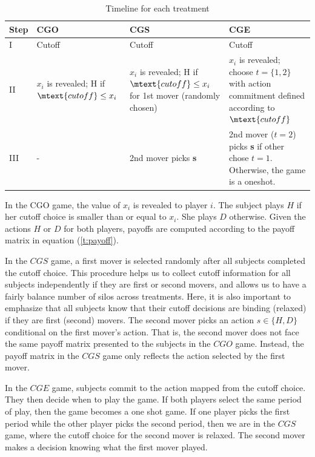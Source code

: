 \documentclass[11pt,english]{article}
\begin{document}
\begin{table}[ht]
\begin{center}
\begin{tabular}{l|m{2.4cm}|m{3.5cm}|m{4cm}}
  Step & CGO & CGS & CGE\\
  \hline 
I & Cutoff & Cutoff & Cutoff \\
\hline
II& $x_i$ is revealed; H if $\mtext{cutoff}\leq x_i$ & $x_i$ is revealed; H if $\mtext{cutoff}\leq x_i$ for 1st mover (randomly chosen)
& $x_i$ is revealed; choose $t=\{1,2\}$ with action commitment defined according to $\mtext{cutoff}$\\
\hline
III & - & 2nd mover picks \textbf{s} & 2nd mover ($t=2$) picks \textbf{s} if other chose $t=1$. Otherwise, the game is a oneshot.

\end{tabular}
\end{center}
\caption{Timeline for each treatment}
\label{table:time}
\end{table}

In the CGO game, the value of $x_i$ is revealed to player $i$. The subject plays $H$ if her cutoff choice is smaller than or equal to $x_i$. She plays $D$ otherwise. Given the actions $H$ or $D$ for both players, payoffs are computed according to the payoff matrix in equation (\ref{t:payoff}). 

In the $CGS$ game, a first mover is selected randomly after all subjects completed the cutoff choice. This procedure helps us to collect cutoff information for all subjects independently if they are first or second movers, and allows us to have a fairly balance number of silos across treatments. Here, it is also important to emphasize that all subjects know that their cutoff decisions are binding (relaxed) if they are first (second) movers. The second mover picks an action $s\in\{H,D\}$ conditional on the first mover's action. That is, the second mover does not face the same payoff matrix presented to the subjects in the $CGO $ game. Instead, the payoff matrix in the $CGS$ game only reflects the action selected by the first mover. 

In the $CGE$ game, subjects commit to the action mapped from the cutoff choice. They then decide when to play the game. If both players select the same period of play, then the game becomes a one shot game. If one player picks the first period while the other player picks the second period, then we are in the $CGS$ game, where the cutoff choice for the second mover is relaxed. The second mover makes a decision knowing what the first mover played. 
\end{document}
